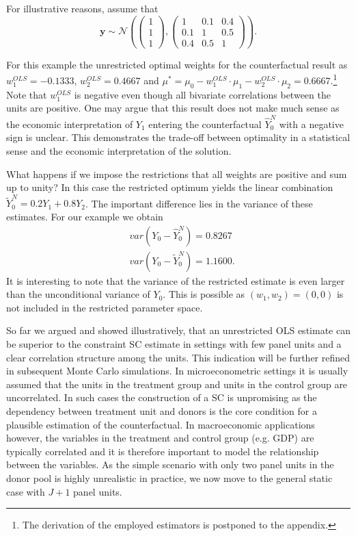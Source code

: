 For illustrative reasons, assume that 
\[
\boldsymbol{y} \sim \mathcal{N}\left( 
\begin{pmatrix} 1\\ 1\\ 1 \end{pmatrix}, 
\begin{pmatrix} 1 &0.1 &0.4\\0.1 &1 &0.5\\0.4 &0.5 &1 \end{pmatrix}\right). 
\] 

For this example the unrestricted optimal weights for the counterfactual result as $w_1^{OLS} = -0.1333$, $w_2^{OLS} = 0.4667$ and $\mu^* = \mu_0 - w_1^{OLS} \cdot \mu_1 - w_2^{OLS} \cdot \mu_2 = 0.6667$.\footnote{The derivation of the employed estimators is postponed to the appendix.} Note that $w_1^{OLS}$ is negative even though all bivariate correlations between the units are positive. One may argue that this result does not make much sense as the economic interpretation of $Y_1$ entering the counterfactual $\widehat{Y}^{N}_{0}$ with a negative sign is unclear. This demonstrates the trade-off between optimality in a statistical sense and the economic interpretation of the solution.  

What happens if we impose the restrictions that all weights are positive and sum up to unity? In this case the restricted optimum yields the linear combination $\widetilde{Y}^{N}_{0} = 0.2 Y_1 + 0.8 Y_2$.
The important difference lies in the variance of these estimates. For our example we obtain
\begin{equation*}
	\begin{split}
		& var(Y_0 - \widehat{Y}^{N}_{0}) = 0.8267 \\
		& var(Y_0 - \widetilde{Y}^{N}_{0}) = 1.1600.
	\end{split}
\end{equation*}
It is interesting to note that the variance of the restricted estimate is even larger than the unconditional variance of $Y_0$. This is possible as $(w_1, w_2) = (0,0)$ is not included in the restricted parameter space. 

So far we argued and showed illustratively, that an unrestricted \ac{OLS} estimate can be superior to the constraint \ac{SC} estimate in settings with few panel units and a clear correlation structure among the units. This indication will be further refined in subsequent Monte Carlo simulations. In microeconometric settings it is usually assumed that the units in the treatment group and units in the control group are uncorrelated. In such cases the construction of a \ac{SC} is unpromising as the dependency between treatment unit and donors is the core condition for a plausible estimation of the counterfactual. In macroeconomic applications however, the variables in the treatment and control group (e.g. \ac{GDP}) are typically correlated and it is therefore important to model the relationship between the variables. As the simple scenario with only two panel units in the donor pool is highly unrealistic in practice, we now move to the general static case with $J+1$ panel units.
